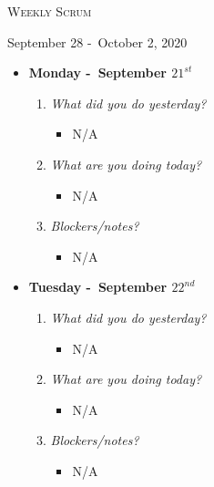 \centerline{\LARGE\textsc{Weekly Scrum}}
\centerline{September 28 -\ October 2, 2020}
\textbf{}
\begin{itemize}
  \item[] \textbf{\large Monday -\ September \(21^{st}\)}
  \begin{enumerate}
    \item \textsl{What did you do yesterday?}
    \begin{itemize}
      \item N/A
    \end{itemize}
    \item \textsl{What are you doing today?}
    \begin{itemize}
      \item N/A
    \end{itemize}
    \item \textsl{Blockers/notes?}
    \begin{itemize}
      \item N/A
    \end{itemize}
  \end{enumerate}
\end{itemize}
\textbf{}
\begin{itemize}
  \item[] \textbf{\large Tuesday -\ September \(22^{nd}\)}
  \begin{enumerate}
    \item \textsl{What did you do yesterday?}
    \begin{itemize}
      \item N/A
    \end{itemize}
    \item \textsl{What are you doing today?}
    \begin{itemize}
      \item N/A
    \end{itemize}
    \item \textsl{Blockers/notes?}
    \begin{itemize}
      \item N/A
    \end{itemize}
  \end{enumerate}
\end{itemize}
\textbf{}
